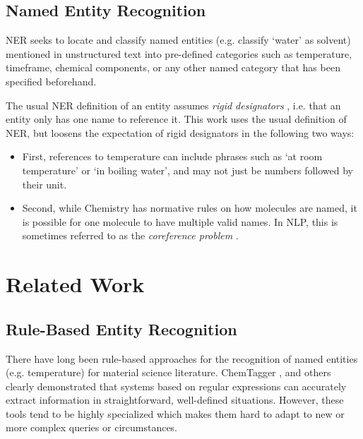 \subsection{Named Entity Recognition}\label{sub:NER}
\gls{NER} seeks to locate and classify named entities (e.g. classify `water' as solvent) mentioned in unstructured text into pre-defined categories \cite{li_survey_2022} such as temperature, timeframe, chemical components, or any other named category that has been specified beforehand.

The usual \gls{NER} definition of an entity assumes \textit{rigid designators} \cite{laporte_rigid_2022}, i.e. that an entity only has one name to reference it.
This work uses the usual definition of \gls{NER}, but loosens the expectation of rigid designators in the following two ways:

\begin{itemize}
    \item First, references to temperature can include phrases such as `at room temperature' or `in boiling water', and may not just be numbers followed by their unit.
    \item Second, while Chemistry has normative rules on how molecules are named, it is possible for one molecule to have multiple valid names.
In \gls{NLP}, this is sometimes referred to as the \textit{coreference problem} \cite{hobbs_coherence_1979}.
\end{itemize}



\section{Related Work}\label{sec:related}

\subsection{Rule-Based Entity Recognition}\label{sub:rule-based}
There have long been rule-based approaches for the recognition of named entities (e.g. temperature) for material science literature.
ChemTagger \cite{hawizy_chemicaltagger_2011}, and others \cite{beard_comparative_2019, huang_database_2020}
clearly demonstrated that systems based on regular expressions can accurately extract information in straightforward, well-defined situations.
However, these tools tend to be highly specialized which makes them hard to adapt to new or more complex queries or circumstances.


